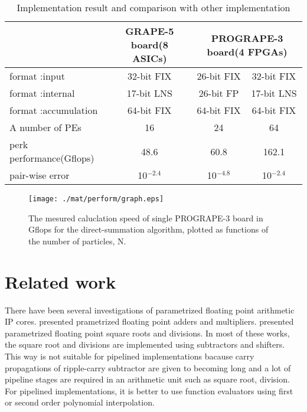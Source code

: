 \documentclass{llncs}
\begin{document}
\begin{table*}
\caption{Implementation result and comparison with other implementation}
\begin{center}
\begin{tabular}{lccc}
\hline
\hline
                     & GRAPE-5 board(8 ASICs) & \multicolumn{2}{c}{PROGRAPE-3 board(4 FPGAs)}  \\
\hline
format :input        & 32-bit FIX          & 26-bit FIX   & 32-bit FIX \\
format :internal     & 17-bit LNS          & 26-bit FP    & 17-bit LNS \\
format :accumulation & 64-bit FIX          & 64-bit FIX   & 64-bit FIX \\
A number of PEs      & 16                  &   24         &   64         \\
perk performance(Gflops)    & 48.6         & 60.8         & 162.1        \\
pair-wise error             & 10$^{-2.4}$   &  10$^{-4.8}$ & 10$^{-2.4}$ \\

\hline
\hline
\end{tabular}
\end{center}
\label{tabcompg5}
\end{table*}

\begin{figure}[htb]
\begin{center}
\texttt{[image: ./mat/perform/graph.eps]}
\caption{The mesured caluclation speed of single PROGRAPE-3 board in Gflops for the direct-summation algorithm, plotted as functions of the number of particles, N.}
\label{MESURE-PERFORM}
\end{center}
\end{figure}


\section{Related work}

There have been several investigations of parametrized floating point
arithmetic IP cores. \cite{JL01,LCCN03} presented prametrized floating
point adders and multipliers. \cite{LKM02,WN04} presented parametrized
floating point square roots and divisions. In most of these works, the
square root and divisions are implemented using subtractors and
shifters. This way is not suitable for pipelined implementations
bacause carry propagations of ripple-carry subtractor are given to becoming long and
a lot of pipeline stages are required in an arithmetic unit such as square
root, division. For pipelined implementations, it is better to use
function evaluators using first or second order polynomial
interpolation.
\end{document}
